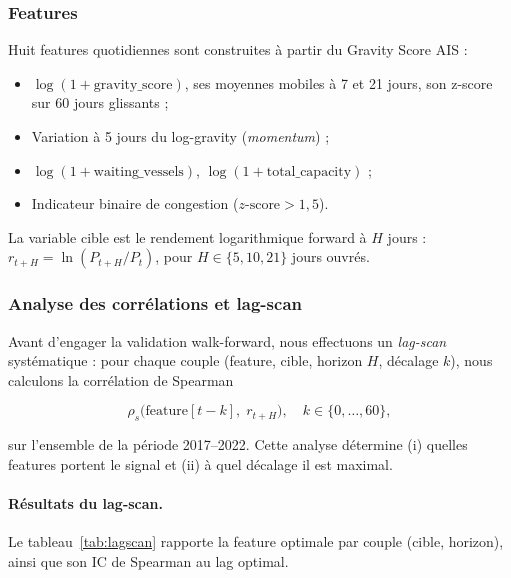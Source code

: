 \subsubsection{Features}

Huit features quotidiennes sont construites à partir du Gravity Score AIS :

\begin{itemize}
    \item $\log(1 + \text{gravity\_score})$, ses moyennes mobiles à 7 et 21
    jours, son z-score sur 60 jours glissants ;
    \item Variation à 5 jours du log-gravity (\emph{momentum}) ;
    \item $\log(1 + \text{waiting\_vessels})$, $\log(1 + \text{total\_capacity})$ ;
    \item Indicateur binaire de congestion ($z\text{-score} > 1{,}5$).
\end{itemize}

La variable cible est le rendement logarithmique forward à $H$ jours :
$r_{t+H} = \ln(P_{t+H}/P_t)$, pour $H \in \{5, 10, 21\}$ jours ouvrés.

\subsubsection{Analyse des corrélations et lag-scan}
\label{sec:lagscan}

Avant d'engager la validation walk-forward, nous effectuons un \emph{lag-scan}
systématique : pour chaque couple (feature, cible, horizon $H$, décalage $k$),
nous calculons la corrélation de Spearman

\[
\rho_s\!\bigl(\text{feature}[t - k],\; r_{t+H}\bigr), \quad k \in \{0,\ldots,60\},
\]

sur l'ensemble de la période 2017--2022. Cette analyse détermine (i) quelles
features portent le signal et (ii) à quel décalage il est maximal.

\paragraph{Résultats du lag-scan.}
Le tableau~\ref{tab:lagscan} rapporte la feature optimale par couple
(cible, horizon), ainsi que son IC de Spearman au lag optimal.

